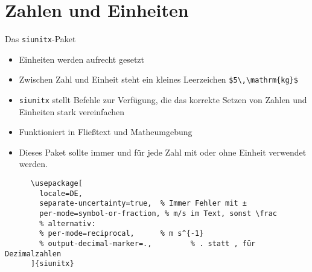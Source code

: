 \section{Zahlen und Einheiten}

\begin{frame}[fragile]{
  Das \texttt{siunitx}-Paket
  \hfill
}
\begin{itemize}
    \item Einheiten werden aufrecht gesetzt
    \item Zwischen Zahl und Einheit steht ein kleines Leerzeichen \lstinline+$5\,\mathrm{kg}$+
    \item \texttt{siunitx} stellt Befehle zur Verfügung, die das korrekte Setzen von Zahlen und Einheiten stark vereinfachen
    \item Funktioniert in Fließtext und Matheumgebung
    \item[$\color{vertexDarkRed}\Rightarrow$] Dieses Paket sollte \alert{immer} und für \alert{jede} Zahl mit oder ohne Einheit verwendet werden.
\end{itemize}
  \begin{Packages}
    \begin{lstlisting}
      \usepackage[
        locale=DE,
        separate-uncertainty=true,  % Immer Fehler mit ±
        per-mode=symbol-or-fraction, % m/s im Text, sonst \frac
        % alternativ:
        % per-mode=reciprocal,      % m s^{-1}
        % output-decimal-marker=.,         % . statt , für Dezimalzahlen
      ]{siunitx}
    \end{lstlisting}
  \end{Packages}
\end{frame}

